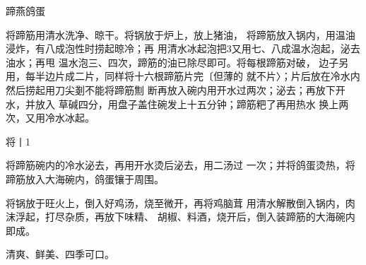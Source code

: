 \begin{recipe}{蹄燕鸽蛋}

\ingredients


\cooking

\step 将蹄筋用清水洗净、晾干。将锅放于炉上，放上猪油， 将蹄筋放入锅内，用温油浸炸，有八成泡性时捞起晾冷；再 用清水冰起泡把3又用七、八成温水泡起，泌去油水；再甩 温水泡三、四次，蹄筋的油已除尽即可。将每根蹄筋对破， 边子另用，每半边片成二片，同样将十六根蹄筋片完〔但薄的 就不片〉；片后放在冷水内然后捞起用刀尖剗不能将蹄筋劁 断再放入碗内用开水过两次；泌去；再放下开水，并放入 草碱四分，用盘子盖住碗发上十五分钟；蹄筋粑了再用热水 换上两次，又用冷水冰起。

\step 将丨1%

\step 	将蹄筋碗内的冷水泌去，再用开水烫后泌去，用二汤过 一次；并将鸽蛋烫热，将蹄筋放入大海碗内，鸽蛋镶于周围。

\step 	将锅放于旺火上，倒入好鸡汤，烧至微开，再将鸡脑茸 用清水解散倒入锅内，肉沫浮起，打尽杂质，再放下味精、 胡椒、料酒，烧开后，倒入装蹄筋的大海碗内即成。

\notes

清爽、鲜美、四季可口。

\end{recipe}

